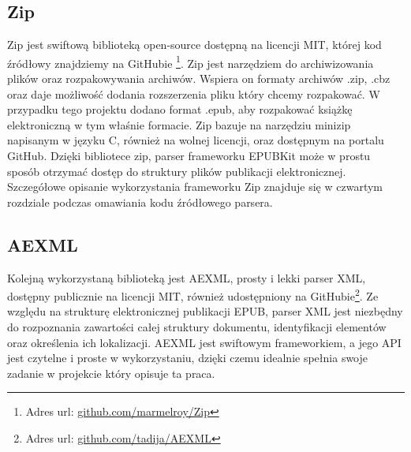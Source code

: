 \subsection{Zip}

Zip jest swiftową biblioteką open-source dostępną na licencji MIT, której kod źródłowy znajdziemy na GitHubie \footnote{Adres url: \href{https://github.com/marmelroy/Zip}{github.com/marmelroy/Zip}}. Zip jest narzędziem do archiwizowania plików oraz rozpakowywania archiwów. Wspiera on formaty archiwów .zip, .cbz oraz daje możliwość dodania rozszerzenia pliku który chcemy rozpakować. W przypadku tego projektu dodano format .epub, aby rozpakować książkę elektroniczną w tym właśnie formacie. Zip bazuje na narzędziu minizip napisanym w języku C, również na wolnej licencji, oraz dostępnym na portalu GitHub. Dzięki bibliotece zip, parser frameworku EPUBKit może w prostu sposób otrzymać dostęp do struktury plików publikacji elektronicznej. Szczegółowe opisanie wykorzystania frameworku Zip znajduje się w czwartym rozdziale podczas omawiania kodu źródłowego parsera.

\subsection{AEXML}

Kolejną wykorzystaną biblioteką jest AEXML, prosty i lekki parser XML, dostępny publicznie na licencji MIT, również udostępniony na GitHubie\footnote{Adres url: \href{https://github.com/tadija/AEXML}{github.com/tadija/AEXML}}. Ze względu na strukturę elektronicznej publikacji EPUB, parser XML jest niezbędny do rozpoznania zawartości całej struktury dokumentu, identyfikacji elementów oraz określenia ich lokalizacji. AEXML jest swiftowym frameworkiem, a jego API jest czytelne i proste w wykorzystaniu, dzięki czemu idealnie spełnia swoje zadanie w projekcie który opisuje ta praca.
